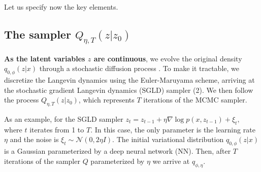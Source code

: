 
Let us specify now the key elements.

\subsection{The sampler $Q_{\eta, T}(z|z_0)$ } \label{sec:grad}

{\bf As the latent variables $z$ are continuous}, %
we evolve the original density $q_{0,\phi}(z|x)$ through a stochastic diffusion process \cite{pavliotis2014stochastic}. To make it tractable, we discretize the Langevin dynamics using the Euler-Maruyama scheme, arriving at the stochastic gradient Langevin dynamics (SGLD) sampler (2).
We then follow the process $Q_{\eta,T} (z | z_0)$,
which represents $T$ iterations of the MCMC sampler. 

As an example, for the SGLD sampler $z_t = z_{t-1} + \eta \nabla \log p(x, z_{t-1}) + \xi_{t},$ where $t$ iterates from 1 to $T$. In this case, the only parameter
is the learning rate $\eta$ and the noise is $\xi_t \sim \mathcal{N}(0, 2\eta I)$. %
The initial variational distribution $q_{0, \phi}(z|x)$ is a Gaussian parameterized by a deep neural network (NN). Then, after $T$ iterations of the sampler $Q$ parameterized by $\eta$ we arrive at $q_{\phi, \eta}$. 

